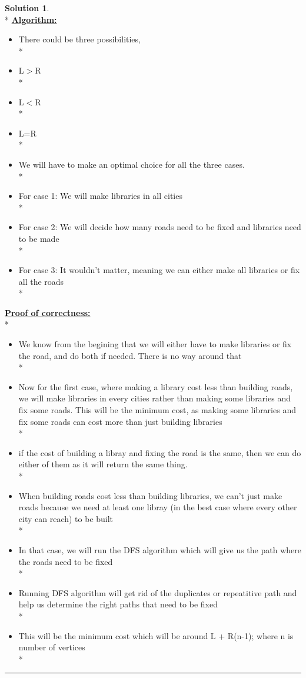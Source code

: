 \documentclass{article}
\theoremstyle{definition}
\def\fline{\rule{0.75\linewidth}{0.5pt}}
\newcommand{\finishline}{\vspace{-15pt}\begin{center}\fline\end{center}}
\newtheorem*{solution*}{Solution}
\newenvironment{solution}{\begin{solution*}}{{\finishline} \end{solution*}}
\begin{document}
\begin{solution}
	\hfill \bigskip\\*
	\textbf{\underline{Algorithm:}}
		\begin{itemize}
			\item There could be three possibilities, \\*
			\item[1.] L$>$R \\*
			\item[2.] L$<$R \\*
			\item[3.] L=R \\*
			\item We will have to make an optimal choice for all the three cases. \\*
			\item For case 1: We will make libraries in all cities \\*
			\item For case 2: We will decide how many roads need to be fixed and libraries need to be made \\*
			\item For case 3: It wouldn't matter, meaning we can either make all libraries or fix all the roads \\*
		\end{itemize} 		
	\textbf{\underline{Proof of correctness:}} \bigskip\\*	
		\begin{itemize}
			\item We know from the begining that we will either have to make libraries or fix the road, and do both if needed. There is no way around that \\*
			\item Now for the first case, where making a library cost less than building roads, we will make libraries in every cities rather than making some libraries and fix some roads. This will be the minimum cost, as making some libraries and fix some roads can cost more than just building libraries \\*
			\item if the cost of building a libray and fixing the road is the same, then we can do either of them as it will return the same thing. \\*
			\item When building roads cost less than building libraries, we can't just make roads because we need at least one libray (in the best case where every other city can reach) to be built \\*
			\item In that case, we will run the DFS algorithm which will give us the path where the roads need to be fixed \\*
			\item Running DFS algorithm will get rid of the duplicates or repeatitive path and help us determine the right paths that need to be fixed \\*
			\item This will be the minimum cost which will be around L + R(n-1); where n is number of vertices \\*
		\end{itemize} 
\end{solution}
\end{document}
